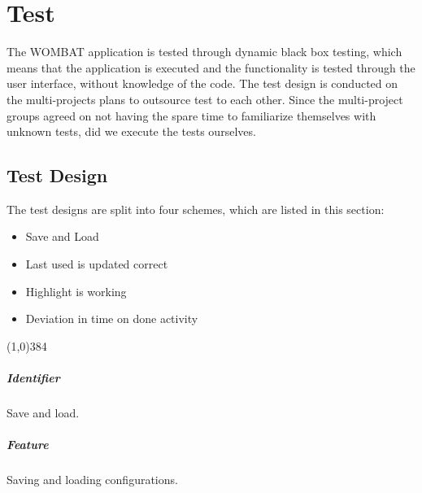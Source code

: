 \chapter{Test}
\label{cha:test}
The WOMBAT application is tested through dynamic black box testing, which means that the application is executed and the functionality is tested through the user interface, without knowledge of the code. 
The test design is conducted on the multi-projects plans to outsource test to each other. 
Since the multi-project groups agreed on not having the spare time to familiarize themselves with unknown tests, did we execute the tests ourselves.

\section{Test Design}
\label{sec:test_design}
The test designs are split into four schemes, which are listed in this section:
\begin{itemize}
	\item Save and Load
	\item Last used is updated correct
	\item Highlight is working
	\item Deviation in time on done activity
\end{itemize}

\pagebreak
\begin{center}
	\line(1,0){384}
\end{center}
\paragraph{Identifier}
	Save and load.
\paragraph{Feature}
	Saving and loading configurations.
